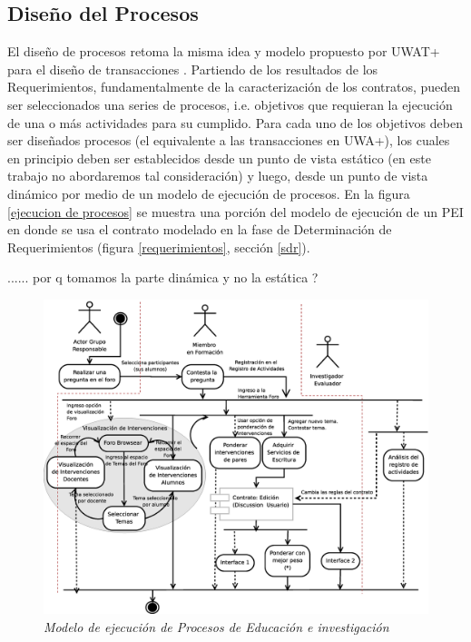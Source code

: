 \documentclass{llncs}
\begin{document}
\subsection{Diseño del Procesos}

El diseño de procesos retoma la misma idea y modelo propuesto por UWAT+ para el diseño de transacciones \cite{UWA+}. Partiendo de los resultados de los Requerimientos, fundamentalmente de la caracterización de los contratos, pueden ser seleccionados una series de procesos, i.e. objetivos que requieran la ejecución de una o más actividades para su cumplido. Para cada uno de los objetivos deben ser diseñados procesos (el equivalente a las transacciones en UWA+), los cuales en principio deben ser establecidos desde un punto de vista estático (en este trabajo no abordaremos tal consideración) y luego, desde un punto de vista dinámico por medio de un modelo de ejecución de procesos. En la figura \ref{ejecucion de procesos} se muestra una porción del modelo de ejecución de un PEI en donde se usa el contrato modelado en la fase de Determinación de Requerimientos (figura \ref{requerimientos}, sección \ref{sdr}). 

...... por q tomamos la parte dinámica y no la estática ?

\begin{figure}[!h]
        \begin{center}

	\includegraphics[width= 5 in,totalheight=3.5 in]{proceso.eps}
                                    \caption{\small \sl Modelo de ejecución de Procesos de Educación e investigación} \label{proceso}
         \end{center}
         \end{figure}
\end{document}
